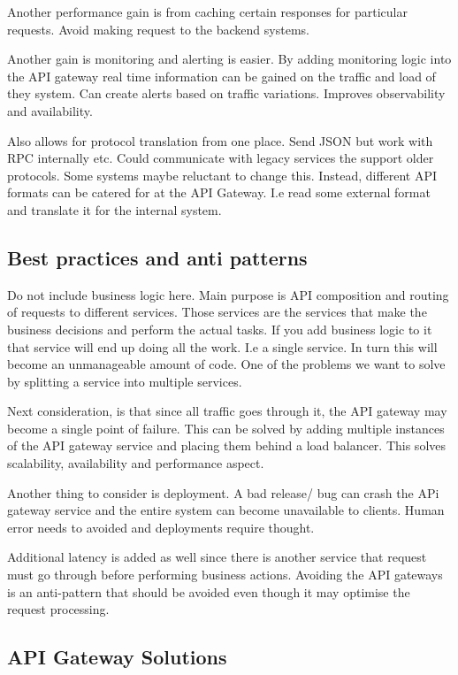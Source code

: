 Another performance gain is from caching certain responses for particular requests.
Avoid making request to the backend systems.

Another gain is monitoring and alerting is easier.
By adding monitoring logic into the API gateway real time information can be gained on the traffic and load of they system.
Can create alerts based on traffic variations.
Improves observability and availability.

Also allows for protocol translation from one place.
Send JSON but work with RPC internally etc.
Could communicate with legacy services the support older protocols.
Some systems maybe reluctant to change this.
Instead, different API formats can be catered for at the API Gateway.
I.e read some external format and translate it for the internal system.

\subsection{Best practices and anti patterns}
Do not include business logic here.
Main purpose is API composition and routing of requests to different services.
Those services are the services that make the business decisions and perform the actual tasks.
If you add business logic to it that service will end up doing all the work.
I.e a single service.
In turn this will become an unmanageable amount of code.
One of the problems we want to solve by splitting a service into multiple services.

Next consideration, is that since all traffic goes through it, the API gateway may become a single point of failure.
This can be solved by adding multiple instances of the API gateway service and placing them behind a load balancer.
This solves scalability, availability and performance aspect.

Another thing to consider is deployment.
A bad release/ bug can crash the APi gateway service and the entire system can become unavailable to clients.
Human error needs to avoided and deployments require thought.

Additional latency is added as well since there is another service that request must go through before performing business actions.
Avoiding the API gateways is an anti-pattern that should be avoided even though it may optimise the request processing.

\subsection{API Gateway Solutions}

